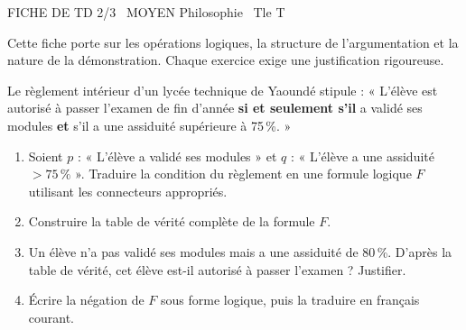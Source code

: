 \documentclass[11pt]{article}
\begin{document}
\begin{tcolorbox}[enhanced,colback=popink,colframe=popink,arc=10pt,boxrule=0pt,left=12pt,right=12pt,top=9pt,bottom=9pt]
{\color{white}\popxbold\small FICHE DE TD 2/3 \textbullet\ MOYEN \hfill Philosophie \textbullet\ Tle T\par}
\end{tcolorbox}
\vspace{4pt}
\noindent Cette fiche porte sur les opérations logiques, la structure de l'argumentation et la nature de la démonstration. Chaque exercice exige une justification rigoureuse.

\begin{exercice}
Le règlement intérieur d'un lycée technique de Yaoundé stipule : « L'élève est autorisé à passer l'examen de fin d'année \textbf{si et seulement s'il} a validé ses modules \textbf{et} s'il a une assiduité supérieure à 75\,\%. »
\begin{enumerate}
    \item Soient $p$ : « L'élève a validé ses modules » et $q$ : « L'élève a une assiduité $> 75\,\%$ ». Traduire la condition du règlement en une formule logique $F$ utilisant les connecteurs appropriés.
    \item Construire la table de vérité complète de la formule $F$.
    \item Un élève n'a pas validé ses modules mais a une assiduité de 80\,\%. D'après la table de vérité, cet élève est-il autorisé à passer l'examen ? Justifier.
    \item Écrire la négation de $F$ sous forme logique, puis la traduire en français courant.
\end{enumerate}
\end{exercice}
\end{document}
